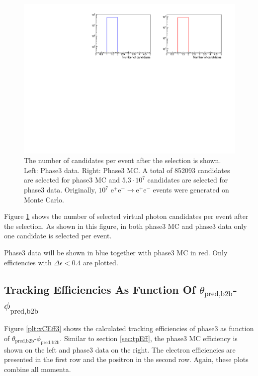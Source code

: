 \documentclass[a4paper,11pt,twosided,final,german,openbib,pdftex,listof=totoc,bibliography=totoc]{scrbook}
\begin{document}
\begin{figure}[h!]
	\includegraphics[width=\textwidth]{Plots/master3/CCandP3.pdf}
	\caption[Total Number Of Events After The Selection Phase3]{The number of candidates per event after the selection is shown. Left: Phase3 data. Right: Phase3 MC. A total of 852093 candidates are selected for phase3 MC and $5.3\cdot10^7$ candidates are selected for phase3 data. Originally, $10^7$ $\textrm{e}^+\textrm{e}^- \rightarrow  \textrm{e}^+\textrm{e}^-  $ events were generated on Monte Carlo.}
	\label{fig:nCandAS3}
\end{figure}

Figure \ref{fig:nCandAS3} shows the number of selected virtual photon candidates per event after the selection. As shown in this figure, in both phase3 MC and phase3 data only one candidate is selected per event.




Phase3 data will be shown in blue together with phase3 MC in red. Only efficiencies with $\Delta \epsilon < 0.4$ are plotted.

\clearpage

\subsection{Tracking Efficiencies As Function Of $\theta_{\textrm{pred,b2b}}$-$\phi_{\textrm{pred,b2b}}$}
\label{sec:tpEff3}

Figure \ref{plt:xCEff3} shows the calculated tracking efficiencies of phase3 as function of $\theta_{\textrm{pred,b2b}}$-$\phi_{\textrm{pred,b2b}}$.
Similar to section \ref{sec:tpEff}, the phase3 MC efficiency is shown on the left and phase3 data on the right. The electron efficiencies are presented in the first row and the positron in the second row. Again, these plots combine all momenta. 
\end{document}
